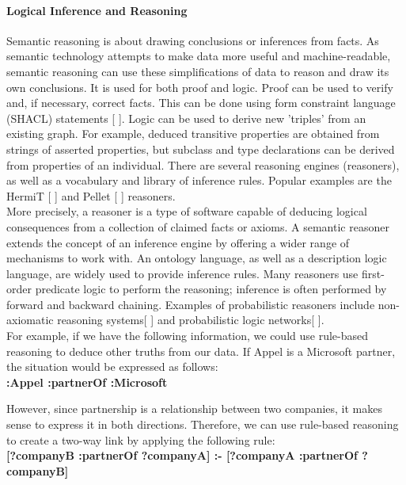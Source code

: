             \paragraph{Logical Inference and Reasoning}
            Semantic reasoning is about drawing conclusions or inferences from facts. As semantic technology attempts to make data more useful and machine-readable, semantic reasoning can use these simplifications of data to reason and draw its own conclusions. It is used for both proof and logic. Proof can be used to verify and, if necessary, correct facts. This can be done using form constraint language (SHACL) statements [ ]. Logic can be used to derive new 'triples' from an existing graph. For example, deduced transitive properties are obtained from strings of asserted properties, but subclass and type declarations can be derived from properties of an individual. There are several reasoning engines (reasoners), as well as a vocabulary and library of inference rules. Popular examples are the HermiT [ ] and Pellet [ ] reasoners.\\
        
            More precisely, a reasoner is a type of software capable of deducing logical consequences from a collection of claimed facts or axioms. A semantic reasoner extends the concept of an inference engine by offering a wider range of mechanisms to work with. An ontology language, as well as a description logic language, are widely used to provide inference rules. Many reasoners use first-order predicate logic to perform the reasoning; inference is often performed by forward and backward chaining. Examples of probabilistic reasoners include non-axiomatic reasoning systems[ ] and probabilistic logic networks[ ].\\
        
            For example, if we have the following information, we could use rule-based reasoning to deduce other truths from our data. If Appel is a Microsoft partner, the situation would be expressed as follows:\\
        
            \textbf{:Appel :partnerOf :Microsoft}
            
            However, since partnership is a relationship between two companies, it makes sense to express it in both directions. Therefore, we can use rule-based reasoning to create a two-way link by applying the following rule:\\
        
            \textbf{[?companyB :partnerOf ?companyA] :- [?companyA :partnerOf ?companyB]}\\
        
